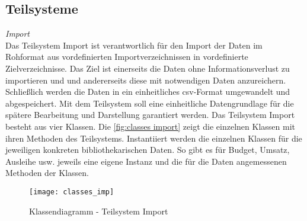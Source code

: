     



    
    
    
    





        

    \subsection{Teilsysteme}
    
    \textit{Import}\\
    Das Teilsystem Import ist verantwortlich für den Import der Daten im Rohformat aus vordefinierten Importverzeichnissen in vordefinierte Zielverzeichnisse. Das Ziel
    ist einerseits die Daten ohne Informationsverlust zu importieren und und andererseits diese mit notwendigen Daten anzureichern. Schließlich werden die Daten
    in ein einheitliches csv-Format umgewandelt und abgespeichert. Mit dem Teilsystem soll eine einheitliche Datengrundlage für die spätere Bearbeitung
    und Darstellung garantiert werden.
    Das Teilsystem Import besteht aus vier Klassen. Die \autoref{fig:classes import} zeigt die einzelnen Klassen mit ihren Methoden des 
    Teilsystems. Instantiiert werden die einzelnen Klassen für die jeweiligen konkreten bibliothekarischen Daten. So gibt es für Budget, Umsatz, Ausleihe usw.
    jeweils eine eigene Instanz und die für die Daten angemessenen Methoden der Klassen.
    
    \begin{figure}[H]
        \centering
            \texttt{[image: classes\_imp]}
            \caption{Klassendiagramm - Teilsystem Import}
            \label{fig:classes import}
    \end{figure}

